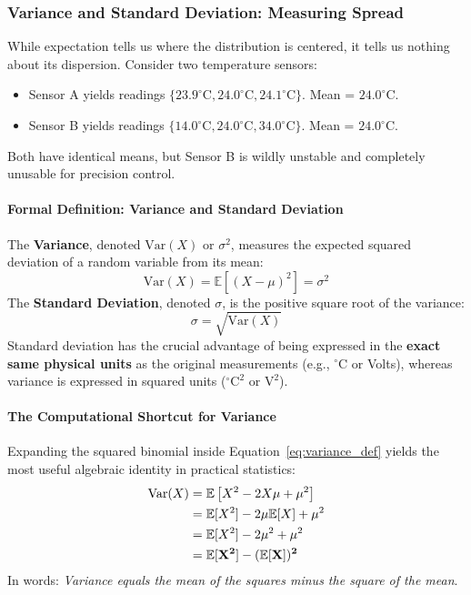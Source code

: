 \subsubsection{Variance and Standard Deviation: Measuring Spread}
While expectation tells us where the distribution is centered, it tells us nothing about its dispersion. Consider two temperature sensors:
\begin{itemize}
    \item Sensor A yields readings $\{23.9^\circ\text{C}, 24.0^\circ\text{C}, 24.1^\circ\text{C}\}$. Mean = $24.0^\circ\text{C}$.
    \item Sensor B yields readings $\{14.0^\circ\text{C}, 24.0^\circ\text{C}, 34.0^\circ\text{C}\}$. Mean = $24.0^\circ\text{C}$.
\end{itemize}
Both have identical means, but Sensor B is wildly unstable and completely unusable for precision control.

\paragraph{Formal Definition: Variance and Standard Deviation}

The \textbf{Variance}, denoted $\text{Var}(X)$ or $\sigma^2$, measures the expected squared deviation of a random variable from its mean:
\begin{equation}
\text{Var}(X) = \mathbb{E}\left[(X - \mu)^2\right] = \sigma^2\label{eq:variance_def}
\end{equation}
The \textbf{Standard Deviation}, denoted $\sigma$, is the positive square root of the variance:
\begin{equation}
\sigma = \sqrt{\text{Var}(X)}
\end{equation}
Standard deviation has the crucial advantage of being expressed in the \textbf{exact same physical units} as the original measurements (e.g., $^\circ\text{C}$ or Volts), whereas variance is expressed in squared units ($^\circ\text{C}^2$ or $\text{V}^2$).


\paragraph{The Computational Shortcut for Variance}
Expanding the squared binomial inside Equation~\eqref{eq:variance_def} yields the most useful algebraic identity in practical statistics:
\begin{align}
\text{Var}(X) &= \mathbb{E}\left[X^2 - 2X\mu + \mu^2\right] \notag\\
&= \mathbb{E}[X^2] - 2\mu \mathbb{E}[X] + \mu^2 \notag\\
&= \mathbb{E}[X^2] - 2\mu^2 + \mu^2 \notag\\
&= \mathbf{\mathbb{E}[X^2] - (\mathbb{E}[X])^2}\label{eq:variance_shortcut}
\end{align}
In words: \textit{Variance equals the mean of the squares minus the square of the mean}.

